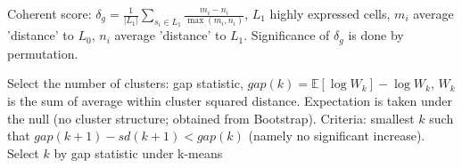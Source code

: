 \documentclass{beamer}
\begin{document}
\begin{frame}[label=supplemental] \label{sec:sup1}
Coherent score: $\delta_g = \frac{1}{|L_1|} \sum_{s_i \in L_1} \frac{m_i - n_i}{\max(m_i, n_i)}$, $L_1$ highly expressed cells, $m_i$ average 'distance' to $L_0$, $n_i$ average 'distance' to $L_1$. Significance of $\delta_g$ is done by permutation.
\end{frame}

\begin{frame}[label=supplemental] \label{sec:sup2}
Select the number of clusters: gap statistic, $gap(k) = \mathbb{E}[\log W_k] - \log W_k$, $W_k$ is the sum of average within cluster squared distance. Expectation is taken under the null (no cluster structure; obtained from Bootstrap). Criteria: smallest $k$ such that $gap(k+1) - sd(k+1) < gap(k)$ (namely no significant increase). Select $k$ by gap statistic under k-means
\end{frame}

\end{document}
